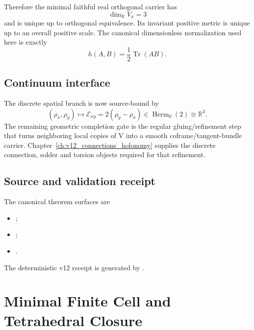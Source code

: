 \documentclass[11pt,a4paper,twoside]{book}
\def\({}%
\def\){}%
\theoremstyle{definition}
\begin{document}
Therefore the minimal faithful real orthogonal carrier has
\[
\boxed{\dim_{\mathbb R}V_x=3}
\]
and is unique up to orthogonal equivalence.  Its invariant positive metric is
unique up to an overall positive scale.  The canonical dimensionless
normalization used here is exactly
\[
h(A,B)=\frac12\operatorname{Tr}(AB).
\]

\section{Continuum interface}

The discrete spatial branch is now source-bound by
\[
\boxed{
(\rho_x,\rho_y)
\longmapsto
\mathcal E_{xy}=2(\rho_y-\rho_x)
\in\operatorname{Herm}_0(2)\cong\mathbb R^3.
}
\]
The remaining geometric completion gate is the regular gluing/refinement step
that turns neighboring local copies of \(V\) into a smooth coframe/tangent-bundle
carrier.  Chapter~\ref{ch:v12_connections_holonomy} supplies the discrete
connection, solder and torsion objects required for that refinement.

\section{Source and validation receipt}

The canonical theorem surfaces are
\begin{itemize}
\item {};
\item {};
\item {}.
\end{itemize}

The deterministic v12 receipt is generated by
.

\clearpage

\chapter{Minimal Finite Cell and Tetrahedral Closure}
\label{ch:v12_tetrahedral_closure}
\end{document}
